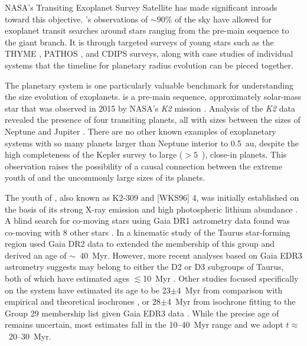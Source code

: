 \documentclass[twocolumn]{aastex631}
\begin{document}
NASA's Transiting Exoplanet Survey Satellite \citep[TESS,][]{Ricker2015} has made significant inroads toward this objective. \tess's observations of $\sim 90 \%$ of the sky have allowed for exoplanet transit searches around stars ranging from the pre-main sequence to the giant branch. It is through targeted surveys of young stars such as the THYME \citep[e.g.][]{Newton2019}, PATHOS \citep[e.g.][]{Nardiello2020}, and CDIPS \citep[e.g.][]{Bouma2020} surveys, along with case studies of individual systems \citep[e.g.][]{benatti19, Plavchan2020, Hedges2021, Zhou2021} that the timeline for planetary radius evolution can be pieced together. 

The \sname planetary system is one particularly valuable benchmark for understanding the size evolution of exoplanets. \sname is a pre-main sequence, approximately solar-mass star that was observed in 2015 by NASA's \textit{K2} mission \citep{Howell2014}. Analysis of the \textit{K2} data revealed the presence of four transiting planets, all with sizes between the sizes of Neptune and Jupiter \citep{David2019a, David2019b}. There are no other known examples of exoplanetary systems with so many planets larger than Neptune interior to 0.5~au, despite the high completeness of the Kepler survey to large ($>5$~\rearth), close-in planets. This observation raises the possibility of a causal connection between the extreme youth of \sname and the uncommonly large sizes of its planets.  

The youth of \sname, also known as K2-309 and [WKS96] 4, was initially established on the basis of its strong X-ray emission \citep{Wichmann1996} and high photospheric lithium abundance \citep{Wichmann2000}. A blind search for co-moving stars using Gaia DR1 astrometry data found \sname was co-moving with 8 other stars \citep[Group 29 in][]{Oh2017}. In a kinematic study of the Taurus star-forming region \citet{Luhman2018} used Gaia DR2 data to extended the membership of this group and derived an age of $\sim$~40~Myr. However, more recent analyses based on Gaia EDR3 astrometry suggests \sname may belong to either the D2 or D3 subgroups of Taurus, both of which have estimated ages $\lesssim$10~Myr \citep{gaidos21, Krolikowski2021}. Other studies focused specifically on the \sname system have estimated its age to be 23$\pm$4~Myr from comparison with empirical and theoretical isochrones \citep{David2019b}, or 28$\pm$4~Myr from isochrone fitting to the \citet{Luhman2018} Group 29 membership list given Gaia EDR3 data \citep{johnson21}. While the precise age of \sname remains uncertain, most estimates fall in the 10--40~Myr range and we adopt $t \approx$~20--30~Myr.
\end{document}
